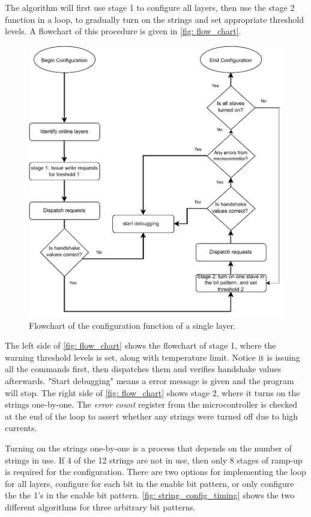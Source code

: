 \documentclass[main.tex]{subfiles}
\begin{document}
The algorithm will first use stage 1 to configure all layers, then use the stage 2 function in a loop, to gradually turn on the strings and set appropriate threshold levels. A flowchart of this procedure is given in \autoref{fig: flow_chart}.

\begin{figure}[!ht]
    \centering
    \includegraphics[width=12cm, scale=1.5]{images/new_config_chart.pdf}
    \caption{Flowchart of the configuration function of a single layer.}
    \label{fig: flow_chart}
\end{figure}
\FloatBarrier

The left side of \autoref{fig: flow_chart} shows the flowchart of stage 1, where the warning threshold levels is set, along with temperature limit. Notice it is issuing all the commands first, then dispatches them and verifies handshake values afterwards. "Start debugging" means a error message is given and the program will stop. The right side of \autoref{fig: flow_chart} shows stage 2, where it turns on the strings one-by-one. The \textit{error count} register from the microcontroller is checked at the end of the loop to assert whether any strings were turned off due to high currents.

Turning on the strings one-by-one is a process that depends on the number of strings in use. If 4 of the 12 strings are not in use, then only 8 stages of ramp-up is required for the configuration. There are two options for implementing the loop for all layers, configure for each bit in the enable bit pattern, or only configure the the 1's in the enable bit pattern. \autoref{fig: string_config_timing} shows the two different algorithms for three arbitrary bit patterns.
\end{document}
